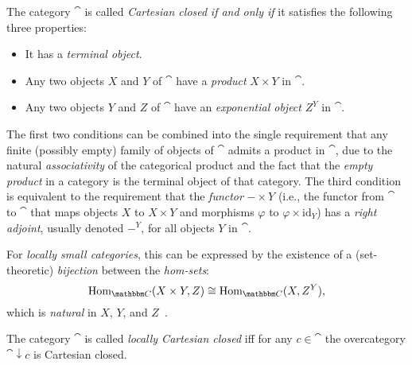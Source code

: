\documentclass[a4paper,11pt]{article}  %
\begin{document}
\begin{definition}
The category $\cat$ is called \emph{Cartesian closed} \emph{if and only if} it satisfies the following three properties:

\begin{itemize}
    \item It has a \emph{terminal object}.
    \item Any two objects \(X\) and \(Y\) of $\cat$ have a \emph{product} \(X \times Y\) in $\cat$.
    \item Any two objects \(Y\) and \(Z\) of $\cat$ have an \emph{exponential object} \(Z^Y\) in $\cat$.
\end{itemize}
\end{definition}

\begin{remark}
	The first two conditions can be combined into the single requirement that any finite (possibly empty) family of objects of $\cat$ admits a product in $\cat$, due to the natural \emph{associativity} of the categorical product and the fact that the \emph{empty product} in a category is the terminal object of that category.
	The third condition is equivalent to the requirement that the \emph{functor} \(- \times Y\) (i.e., the functor from $\cat$ to $\cat$ that maps objects \(X\) to \(X \times Y\) and morphisms \(\varphi\) to \(\varphi \times \mathrm{id}_Y\)) has a \emph{right adjoint}, usually denoted \(-^Y\), for all objects \(Y\) in $\cat$. 
	
	For \emph{locally small categories}, this can be expressed by the existence of a (set-theoretic) \emph{bijection} between the \emph{hom-sets}:
\[
\Hom_{\cat}(X \times Y, Z) \cong \Hom_{\cat}(X, Z^Y),
\]
	which is \emph{natural} in \(X\), \(Y\), and \(Z\)~\cite{nlab:cartesian_closed_category}.
\end{remark}

\begin{definition}
	The category $\cat$ is called \emph{locally Cartesian closed} iff for any $c \in\cat$ the overcategory $\cat \downarrow c$ is Cartesian closed.
\end{definition}
\end{document}
